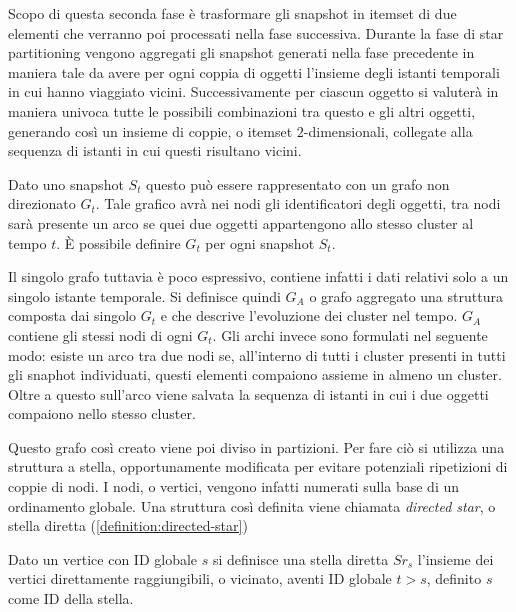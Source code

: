 Scopo di questa seconda fase è trasformare gli snapshot in itemset di due elementi che verranno poi processati nella fase successiva.
Durante la fase di star partitioning vengono aggregati gli snapshot generati nella fase precedente in maniera tale da avere per ogni coppia di oggetti l'insieme degli istanti temporali in cui hanno viaggiato vicini.
Successivamente per ciascun oggetto si valuterà in maniera univoca tutte le possibili combinazioni tra questo e gli altri oggetti, generando così un insieme di coppie, o itemset \(2\)-dimensionali, collegate alla sequenza di istanti in cui questi risultano vicini.

Dato uno snapshot \(S_{t}\) questo può essere rappresentato con un grafo non direzionato \(G_t\).
Tale grafico avrà nei nodi gli identificatori degli oggetti, tra nodi sarà presente un arco se quei due oggetti appartengono allo stesso cluster al tempo \(t\).
È possibile definire \(G_t\) per ogni snapshot \(S_t\).

Il singolo grafo tuttavia è poco espressivo, contiene infatti i dati relativi solo a un singolo istante temporale.
Si definisce quindi \(G_A\) o grafo aggregato una struttura composta dai singolo \(G_t\) e che descrive l'evoluzione dei cluster nel tempo.
\(G_A\) contiene gli stessi nodi di ogni \(G_t\).
Gli archi invece sono formulati nel seguente modo: esiste un arco tra due nodi se, all'interno di tutti i cluster presenti in tutti gli snaphot individuati, questi elementi compaiono assieme in almeno un cluster.
Oltre a questo sull'arco viene salvata la sequenza di istanti in cui i due oggetti compaiono nello stesso cluster.

Questo grafo così creato viene poi diviso in partizioni.
Per fare ciò si utilizza una struttura a stella, opportunamente modificata per evitare potenziali ripetizioni di coppie di nodi.
I nodi, o vertici, vengono infatti numerati sulla base di un ordinamento globale.
Una struttura così definita viene chiamata \textit{directed star}, o stella diretta (\cref{definition:directed-star})

\begin{definition}\label{definition:directed-star}

Dato un vertice con ID globale \(s\) si definisce una stella diretta \(Sr_s\) l'insieme dei vertici direttamente raggiungibili, o vicinato, 
aventi ID globale \(t > s\), definito \(s\) come ID della stella.

\end{definition}

